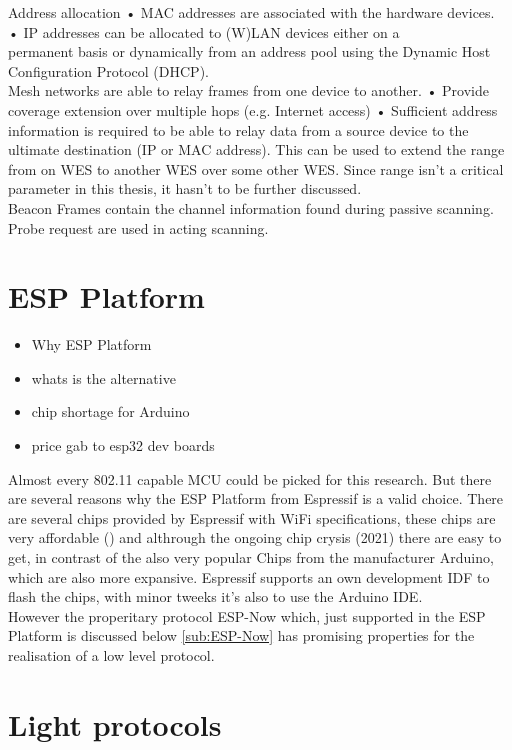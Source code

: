 \documentclass[]{ccs-thesis}
\begin{document}
Address allocation
• MAC addresses are associated with the hardware devices.\\
• IP addresses can be allocated to (W)LAN devices either on a\\
permanent basis or dynamically from an address pool using the
Dynamic Host Configuration Protocol (DHCP). \\

Mesh networks
are able to relay frames from one device to another.
• Provide coverage extension over multiple hops (e.g. Internet access)
• Sufficient address information is required to be able to relay data from a
source device to the ultimate destination (IP or MAC address).
This can be used to extend the range from on \ac{WES} to another \ac{WES} over some other \ac{WES}.
Since range isn't a critical parameter in this thesis, it hasn't to be further discussed.\\

Beacon Frames
contain the channel information found during passive scanning. Probe request are used in acting scanning.


\section{ESP Platform}
\begin{itemize}
	\item Why ESP Platform 
	\item whats is the alternative
	\item chip shortage for Arduino
	\item price gab to esp32 dev boards
\end{itemize}
Almost every 802.11 capable \ac{MCU} could be picked for this research.
But there are several reasons why the ESP Platform from Espressif is a valid choice.
There are several chips provided by Espressif with WiFi specifications, these chips are very affordable () 
and althrough the ongoing chip crysis (2021) there are easy to get, in contrast of the also very popular Chips from the manufacturer Arduino, which are also more expansive.
Espressif supports an own development IDF to flash the chips, with minor tweeks it's also to use the Arduino IDE.\\
However the properitary protocol ESP-Now which, just supported in the ESP Platform is discussed below \cref{sub:ESP-Now} has promising properties for the realisation of a low level protocol.

\section{Light protocols}
\end{document}
